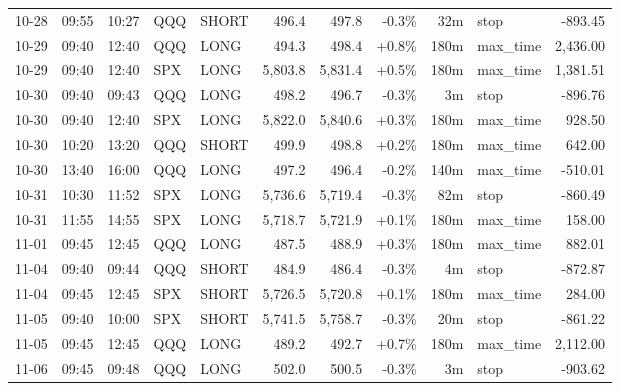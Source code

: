 \documentclass[11pt,a4paper,twoside]{article}
\begin{document}
\begin{center}
\begin{longtable}{>{\color{txtmain}}l l l l l r r r r >{\color{txtmain}}l r}
10-28 & 09:55 & 10:27 & QQQ & SHORT & 496.4 & 497.8 & \textcolor{lossred}{-0.3\%} & 32m & stop & \textcolor{lossred}{-893.45} \\
10-29 & 09:40 & 12:40 & QQQ & LONG & 494.3 & 498.4 & \textcolor{wingreen}{+0.8\%} & 180m & max\_time & \textcolor{wingreen}{2,436.00} \\
10-29 & 09:40 & 12:40 & SPX & LONG & 5,803.8 & 5,831.4 & \textcolor{wingreen}{+0.5\%} & 180m & max\_time & \textcolor{wingreen}{1,381.51} \\
10-30 & 09:40 & 09:43 & QQQ & LONG & 498.2 & 496.7 & \textcolor{lossred}{-0.3\%} & 3m & stop & \textcolor{lossred}{-896.76} \\
10-30 & 09:40 & 12:40 & SPX & LONG & 5,822.0 & 5,840.6 & \textcolor{wingreen}{+0.3\%} & 180m & max\_time & \textcolor{wingreen}{928.50} \\
10-30 & 10:20 & 13:20 & QQQ & SHORT & 499.9 & 498.8 & \textcolor{wingreen}{+0.2\%} & 180m & max\_time & \textcolor{wingreen}{642.00} \\
10-30 & 13:40 & 16:00 & QQQ & LONG & 497.2 & 496.4 & \textcolor{lossred}{-0.2\%} & 140m & max\_time & \textcolor{lossred}{-510.01} \\
10-31 & 10:30 & 11:52 & SPX & LONG & 5,736.6 & 5,719.4 & \textcolor{lossred}{-0.3\%} & 82m & stop & \textcolor{lossred}{-860.49} \\
10-31 & 11:55 & 14:55 & SPX & LONG & 5,718.7 & 5,721.9 & \textcolor{wingreen}{+0.1\%} & 180m & max\_time & \textcolor{wingreen}{158.00} \\
11-01 & 09:45 & 12:45 & QQQ & LONG & 487.5 & 488.9 & \textcolor{wingreen}{+0.3\%} & 180m & max\_time & \textcolor{wingreen}{882.01} \\
11-04 & 09:40 & 09:44 & QQQ & SHORT & 484.9 & 486.4 & \textcolor{lossred}{-0.3\%} & 4m & stop & \textcolor{lossred}{-872.87} \\
11-04 & 09:45 & 12:45 & SPX & SHORT & 5,726.5 & 5,720.8 & \textcolor{wingreen}{+0.1\%} & 180m & max\_time & \textcolor{wingreen}{284.00} \\
11-05 & 09:40 & 10:00 & SPX & SHORT & 5,741.5 & 5,758.7 & \textcolor{lossred}{-0.3\%} & 20m & stop & \textcolor{lossred}{-861.22} \\
11-05 & 09:45 & 12:45 & QQQ & LONG & 489.2 & 492.7 & \textcolor{wingreen}{+0.7\%} & 180m & max\_time & \textcolor{wingreen}{2,112.00} \\
11-06 & 09:45 & 09:48 & QQQ & LONG & 502.0 & 500.5 & \textcolor{lossred}{-0.3\%} & 3m & stop & \textcolor{lossred}{-903.62} \\

\end{longtable}
\end{center}
\end{document}
